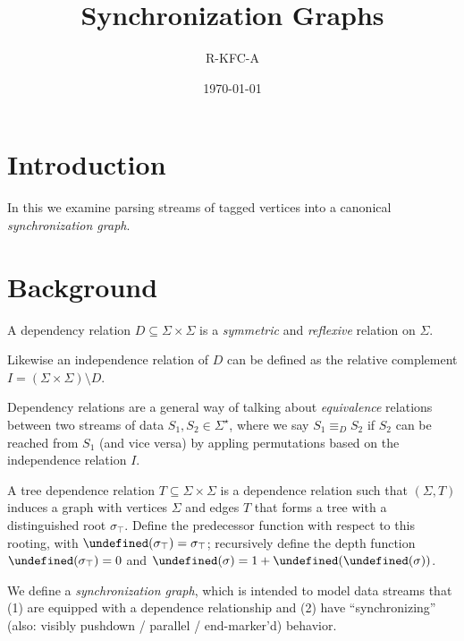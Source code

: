 \documentclass[12pt]{article}
\title{Synchronization Graphs}
\author{R-KFC-A}
\date{\today}
\date{}
\let\pred\undefined
\newcommand{\pred}{\mathbf{pred}}
\let\depth\undefined
\newcommand{\depth}{\mathbf{depth}}
\begin{document}
\maketitle

\section{Introduction}

In this we examine parsing streams of tagged vertices
into a canonical \textit{synchronization graph}.


\section{Background}

\begin{definition}
  A dependency relation \(D \subseteq \Sigma \times \Sigma\)
  is a \textit{symmetric} and \textit{reflexive}
  relation on \(\Sigma\).
\end{definition}

Likewise an independence relation of \(D\) can be defined as
the relative complement
\(I = (\Sigma \times \Sigma) \setminus D\).

Dependency relations are a general way of talking about
\textit{equivalence} relations between two streams of data
\(S_1, S_2 \in \Sigma^\star\),
where we say \(S_1 \equiv_D S_2\) if \(S_2\) can be reached from \(S_1\)
(and vice versa) by appling permutations based on
the independence relation \(I\).

\begin{definition}
  A tree dependence relation \(T \subseteq \Sigma \times \Sigma\)
  is a dependence relation such that
  \((\Sigma, T)\) induces a graph with vertices
  \(\Sigma\) and edges \(T\)
  that forms a tree with a distinguished root \(\sigma_{\top}\).
  Define the predecessor function with respect to this rooting,
  with \(\pred(\sigma_\top) = \sigma_\top\);
  recursively define the depth function
  \(\depth(\sigma_\top) = 0\) and
  \(\depth(\sigma) = 1 + \depth(\pred(\sigma))\).
\end{definition}

We define a \textit{synchronization graph},
which is intended to model data streams that
(1) are equipped with a dependence relationship
and (2) have ``synchronizing''
(also: visibly pushdown / parallel / end-marker'd) behavior.
\end{document}
